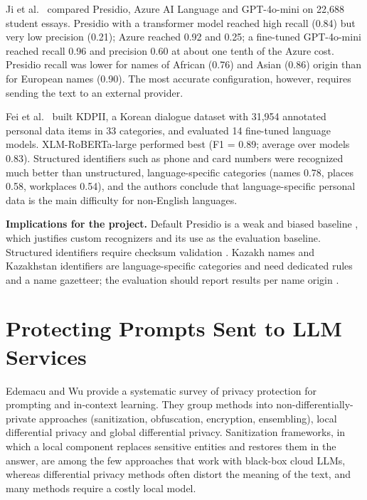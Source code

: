 \documentclass[12pt,a4paper]{article}
\begin{document}
Ji et al.~\cite{r8} compared Presidio, Azure AI Language and GPT-4o-mini on 22,688 student essays. Presidio with a transformer model reached high recall (0.84) but very low precision (0.21); Azure reached 0.92 and 0.25; a fine-tuned GPT-4o-mini reached recall 0.96 and precision 0.60 at about one tenth of the Azure cost. Presidio recall was lower for names of African (0.76) and Asian (0.86) origin than for European names (0.90). The most accurate configuration, however, requires sending the text to an external provider.

Fei et al.~\cite{r9} built KDPII, a Korean dialogue dataset with 31,954 annotated personal data items in 33 categories, and evaluated 14 fine-tuned language models. XLM-RoBERTa-large performed best (F1 = 0.89; average over models 0.83). Structured identifiers such as phone and card numbers were recognized much better than unstructured, language-specific categories (names 0.78, places 0.58, workplaces 0.54), and the authors conclude that language-specific personal data is the main difficulty for non-English languages.

\textbf{Implications for the project.} Default Presidio is a weak and biased baseline \cite{r4,r5,r8}, which justifies custom recognizers and its use as the evaluation baseline. Structured identifiers require checksum validation \cite{r7}. Kazakh names and Kazakhstan identifiers are language-specific categories \cite{r9} and need dedicated rules and a name gazetteer; the evaluation should report results per name origin \cite{r8}.

\section{Protecting Prompts Sent to LLM Services}

Edemacu and Wu \cite{r10} provide a systematic survey of privacy protection for prompting and in-context learning. They group methods into non-differentially-private approaches (sanitization, obfuscation, encryption, ensembling), local differential privacy and global differential privacy. Sanitization frameworks, in which a local component replaces sensitive entities and restores them in the answer, are among the few approaches that work with black-box cloud LLMs, whereas differential privacy methods often distort the meaning of the text, and many methods require a costly local model.
\end{document}
